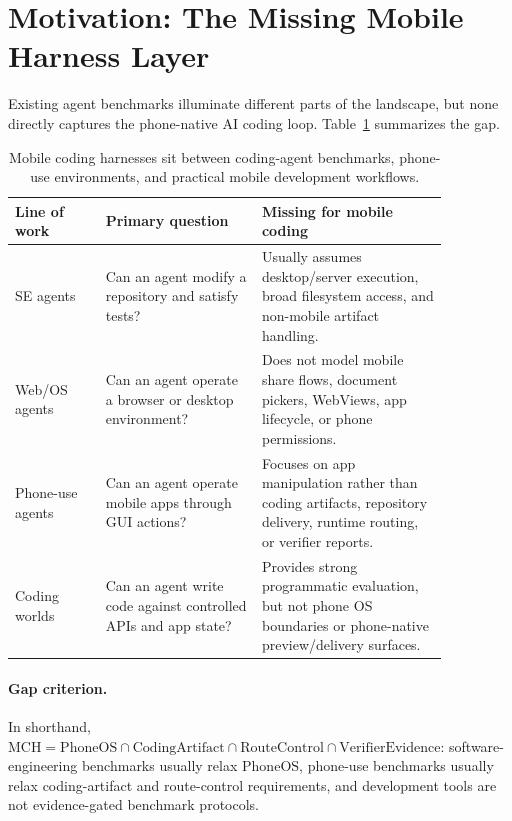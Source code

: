 \documentclass{article}
\begin{document}
\section{Motivation: The Missing Mobile Harness Layer}

Existing agent benchmarks illuminate different parts of the landscape, but none directly captures the phone-native AI coding loop.
Table~\ref{tab:positioning} summarizes the gap.

\begin{table}[t]
\centering
\small
\begin{tabular}{>{\raggedright\arraybackslash}p{0.18\linewidth}>{\raggedright\arraybackslash}p{0.31\linewidth}>{\raggedright\arraybackslash}p{0.37\linewidth}}
\toprule
Line of work & Primary question & Missing for mobile coding \\
\midrule
SE agents & Can an agent modify a repository and satisfy tests? & Usually assumes desktop/server execution, broad filesystem access, and non-mobile artifact handling. \\
Web/OS agents & Can an agent operate a browser or desktop environment? & Does not model mobile share flows, document pickers, WebViews, app lifecycle, or phone permissions. \\
Phone-use agents & Can an agent operate mobile apps through GUI actions? & Focuses on app manipulation rather than coding artifacts, repository delivery, runtime routing, or verifier reports. \\
Coding worlds & Can an agent write code against controlled APIs and app state? & Provides strong programmatic evaluation, but not phone OS boundaries or phone-native preview/delivery surfaces. \\
\bottomrule
\end{tabular}
\caption{Mobile coding harnesses sit between coding-agent benchmarks, phone-use environments, and practical mobile development workflows.}
\label{tab:positioning}
\end{table}

\paragraph{Gap criterion.}
In shorthand, \(\mathrm{MCH}=\mathrm{PhoneOS}\cap\mathrm{CodingArtifact}\cap\mathrm{RouteControl}\cap\mathrm{VerifierEvidence}\): software-engineering benchmarks usually relax \(\mathrm{PhoneOS}\), phone-use benchmarks usually relax coding-artifact and route-control requirements, and development tools are not evidence-gated benchmark protocols.
\end{document}
